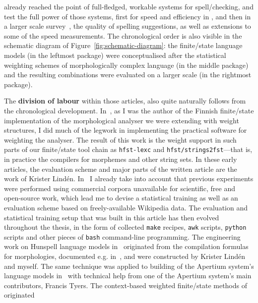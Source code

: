 \documentclass[officiallayout]{unihelcompling}
\begin{document}
already reached the point of full-fledged, workable systems for
spell\-/checking, and test the full power of those systems, first for speed and
efficiency in , and then in a larger scale
survey~, the quality of spelling suggestions, as
well as extensions to some of the speed measurements.  The chronological order
is also visible in the schematic diagram of Figure~\ref{fig:schematic-diagram}:
the finite\-/state language models (in the leftmost package) were conceptualised
after the statistical weighting schemes of morphologically complex language (in
the middle package) and the resulting combinations were evaluated on a larger
scale (in the rightmost package).

The \textbf{division of labour} within those articles, also quite naturally
follows from the chronological development.
In~, as I was the author
of the Finnish finite\-/state implementation of the morphological analyser we
were extending with weight structures, I did much of the legwork in
implementing the practical software for weighting the analyser. The result of
this work is the weight support in such parts of our finite\-/state tool chain
as \texttt{hfst-lexc} and \texttt{hfst\-/strings2fst}---that is, in practice
the compilers for morphemes and other string sets. In these early articles, the
evaluation scheme and major parts of the written article are the work of
Krister Lindén.  In~ I already take into
account that previous experiments were performed using commercial corpora
unavailable for scientific, free and open-source work, which lead me to devise
a statistical training as well as an evaluation scheme based on
freely-available Wikipedia data. The evaluation and statistical training setup
that was built in this article has then evolved throughout the thesis, in the
form of collected \texttt{make} recipes, \texttt{awk} scripts, \texttt{python}
scripts and other pieces of \texttt{bash} command-line programming. The
engineering work on Hunspell language models
in~ originated from the
compilation formulas for morphologies, documented e.g.\/
in~\cite{linden2009hfst}, and were constructed by Krister Lindén and myself.
The same technique was applied to building of the Apertium system's language
models in~ with technical help from one of the
Apertium system's main contributors, Francis Tyers.  The context-based weighted
finite\-/state methods of  originated
\end{document}
